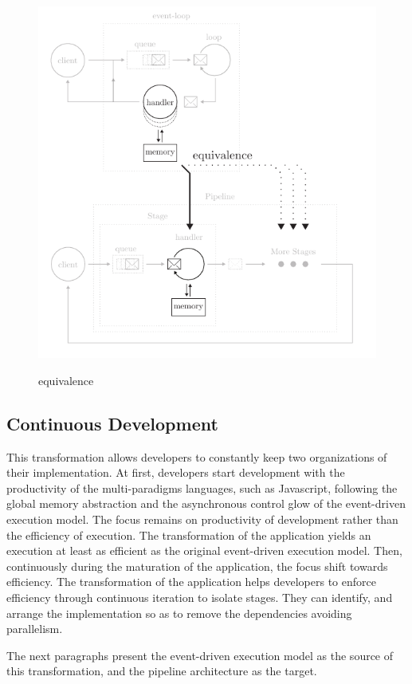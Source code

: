 \begin{figure}
  \centering
  \includegraphics[width=0.8\linewidth]{../resources/equivalence.pdf}
  \label{fig:equivalence}
  \caption{equivalence}
\end{figure}

\subsection{Continuous Development}


This transformation allows developers to constantly keep two organizations of their implementation. %
At first, developers start development with the productivity of the multi-paradigms languages, such as Javascript, following the global memory abstraction and the asynchronous control glow of the event-driven execution model.
The focus remains on productivity of development rather than the efficiency of execution.
The transformation of the application yields an execution at least as efficient as the original event-driven execution model.
Then, continuously during the maturation of the application, the focus shift towards efficiency.
The transformation of the application helps developers to enforce efficiency through continuous iteration to isolate stages.
They can identify, and arrange the implementation so as to remove the dependencies avoiding parallelism.

The next paragraphs present the event-driven execution model as the source of this transformation, and the pipeline architecture as the target.